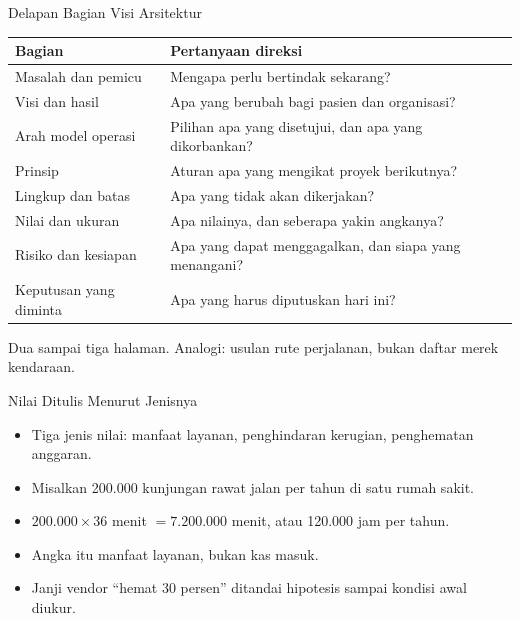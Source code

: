 \documentclass[aspectratio=169, table, 12pt]{beamer}
\begin{document}
\begin{frame}{{\Large Delapan Bagian Visi Arsitektur}}
  \footnotesize
  \begin{tabularx}{\textwidth}{>{\raggedright\arraybackslash}p{3.6cm}
      >{\raggedright\arraybackslash}X}
    \hline
    \textbf{Bagian} & \textbf{Pertanyaan direksi} \\
    \hline
    Masalah dan pemicu & Mengapa perlu bertindak sekarang? \\
    \hline
    Visi dan hasil & Apa yang berubah bagi pasien dan organisasi? \\
    \hline
    Arah model operasi & Pilihan apa yang disetujui, dan apa yang dikorbankan? \\
    \hline
    Prinsip & Aturan apa yang mengikat proyek berikutnya? \\
    \hline
    Lingkup dan batas & Apa yang tidak akan dikerjakan? \\
    \hline
    Nilai dan ukuran & Apa nilainya, dan seberapa yakin angkanya? \\
    \hline
    Risiko dan kesiapan & Apa yang dapat menggagalkan, dan siapa yang menangani? \\
    \hline
    Keputusan yang diminta & Apa yang harus diputuskan hari ini? \\
    \hline
  \end{tabularx}

  \vspace{6pt}
  {\small Dua sampai tiga halaman. Analogi: usulan rute perjalanan, bukan daftar merek kendaraan.}
\end{frame}

\begin{frame}{{\Large Nilai Ditulis Menurut Jenisnya}}
  \vspace{10pt}
  \begin{itemize}
    \item Tiga jenis nilai: manfaat layanan, penghindaran kerugian, penghematan anggaran.
    \item Misalkan 200.000 kunjungan rawat jalan per tahun di satu rumah sakit.
    \item $200.000 \times 36$ menit $= 7.200.000$ menit, atau 120.000 jam per tahun.
    \item Angka itu manfaat layanan, bukan kas masuk.
    \item Janji vendor ``hemat 30 persen'' ditandai hipotesis sampai kondisi awal diukur.
  \end{itemize}
\end{frame}
\end{document}
